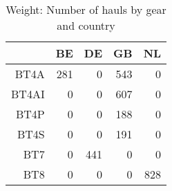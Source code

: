 \begin{table}[ht]
\centering
\begin{tabular}{rrrrr}
  \hline
 & BE & DE & GB & NL \\ 
  \hline
BT4A & 281 & 0 & 543 & 0 \\ 
  BT4AI & 0 & 0 & 607 & 0 \\ 
  BT4P & 0 & 0 & 188 & 0 \\ 
  BT4S & 0 & 0 & 191 & 0 \\ 
  BT7 & 0 & 441 & 0 & 0 \\ 
  BT8 & 0 & 0 & 0 & 828 \\ 
   \hline
\end{tabular}
\caption{Weight: Number of hauls by gear and country} 
\end{table}
